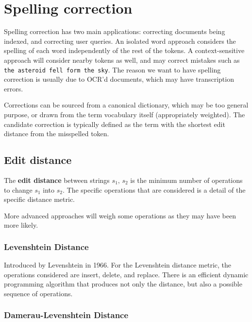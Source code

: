 \documentclass{idc_msc}
\begin{document}
\section{Spelling correction}

Spelling correction has two main applications: correcting documents being indexed, and correcting user queries.
An isolated word approach considers the spelling of each word independently of the rest of the tokens.
A context-sensitive approach will consider nearby tokens as well, and may correct mistakes such as \texttt{the asteroid fell form the sky}.
The reason we want to have spelling correction is usually due to OCR'd documents, which may have transcription errors.

Corrections can be sourced from a canonical dictionary, which may be too general purpose, or drawn from the term vocabulary itself (appropriately weighted).
The candidate correction is typically defined as the term with the shortest edit distance from the misspelled token.

\subsection{Edit distance}

The \textbf{edit distance} between strings \(s_1,\,s_2\) is the minimum number of operations to change \(s_1\) into \(s_2\).
The specific operations that are considered is a detail of the specific distance metric.

More advanced approaches will weigh some operations as they may have been more likely.

\subsubsection{Levenshtein Distance}

Introduced by Levenshtein in 1966\cite{levenshtein1966binary}.
For the Levenshtein distance metric, the operations considered are insert, delete, and replace.
There is an efficient dynamic programming algorithm that produces not only the distance, but also a possible sequence of operations.


\subsubsection{Damerau-Levenshtein Distance}
\end{document}
